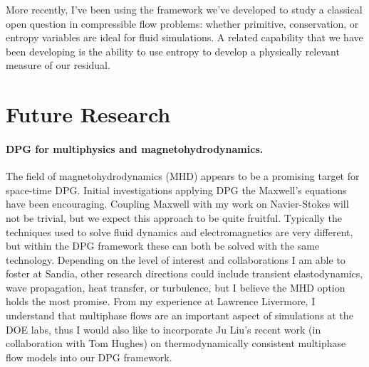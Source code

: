 \documentclass[letterpaper,12pt]{article}
\begin{document}
More recently, I've been using the framework we've developed to study a classical open question in compressible flow problems: 
whether primitive, conservation, or entropy variables are ideal for fluid simulations.
A related capability that we have been developing is the ability to use entropy to develop a physically relevant measure of our residual.

\section*{Future Research}
\paragraph{DPG for multiphysics and magnetohydrodynamics.}
The field of magnetohydrodynamics (MHD) appears to be a promising target for space-time DPG.
Initial investigations applying DPG the Maxwell's equations have been encouraging.
Coupling Maxwell with my work on Navier-Stokes will not be trivial, but we expect this approach to be quite fruitful.
Typically the techniques used to solve fluid dynamics and electromagnetics are very different, but within the DPG framework these can both be solved
with the same technology.
Depending on the level of interest and collaborations I am able to foster at Sandia, 
other research directions could include transient elastodynamics, wave propagation, heat transfer, or turbulence,
but I believe the MHD option holds the most promise.
From my experience at Lawrence Livermore, I understand that multiphase flows are an important aspect of 
simulations at the DOE labs, thus
I would also like to incorporate Ju Liu's recent work (in collaboration with Tom Hughes) on thermodynamically consistent multiphase flow models
into our DPG framework.
\end{document}
